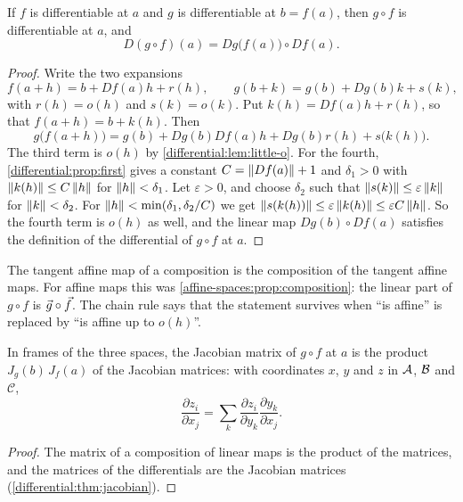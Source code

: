 \begin{notechapter}
\begin{theorem}\label{chain-rule-autodiff:thm:chain}
If $f$ is differentiable at $a$ and $g$ is differentiable at $b = f(a)$,
then $g\circ f$ is differentiable at $a$, and
\[
  D(g\circ f)(a) = Dg\bigl(f(a)\bigr)\circ Df(a) .
\]
\end{theorem}

\begin{proof}
Write the two expansions
\[
  f(a + h) = b + Df(a)h + r(h), \qquad
  g(b + k) = g(b) + Dg(b)k + s(k),
\]
with $r(h) = o(h)$ and $s(k) = o(k)$. Put $k(h) = Df(a)h + r(h)$, so that
$f(a + h) = b + k(h)$. Then
\[
  g\bigl(f(a + h)\bigr)
  = g(b) + Dg(b)Df(a)h + Dg(b)r(h) + s\bigl(k(h)\bigr) .
\]
The third term is $o(h)$ by \cref{differential:lem:little-o}. For the
fourth, \cref{differential:prop:first} gives a constant
$C = \left\|Df(a)\right\| + 1$ and $\delta_1 > 0$ with $\left\|k(h)\right\|\leq C\left\|h\right\|$
for $\left\|h\right\| < \delta_1$. Let $\varepsilon > 0$, and choose $\delta_2$
such that $\left\|s(k)\right\|\leq\varepsilon\left\|k\right\|$ for $\left\|k\right\| < \delta_2$.
For $\left\|h\right\| < \min(\delta_1, \delta_2/C)$ we get
$\left\|s(k(h))\right\|\leq\varepsilon\left\|k(h)\right\|\leq\varepsilon C\left\|h\right\|$. So
the fourth term is $o(h)$ as well, and the linear map $Dg(b)\circ Df(a)$
satisfies the definition of the differential of $g\circ f$ at $a$.
\end{proof}

\begin{keyidea}
The tangent affine map of a composition is the composition of the tangent
affine maps. For affine maps this was
\cref{affine-spaces:prop:composition}: the linear part of $g\circ f$ is
$\vec{g}\circ\vec{f}$. The chain rule says that the statement survives when
``is affine'' is replaced by ``is affine up to $o(h)$''.
\end{keyidea}

\begin{corollary}[In coordinates]\label{chain-rule-autodiff:cor:jacobian}
In frames of the three spaces, the Jacobian matrix of $g\circ f$ at $a$ is
the product $J_g(b)\,J_f(a)$ of the Jacobian matrices: with coordinates
$x$, $y$ and $z$ in $\mathcal{A}$, $\mathcal{B}$ and $\mathcal C$,
\[
  \frac{\partial z_i}{\partial x_j}
  = \sum_k\frac{\partial z_i}{\partial y_k}
    \frac{\partial y_k}{\partial x_j} .
\]
\end{corollary}

\begin{proof}
The matrix of a composition of linear maps is the product of the matrices,
and the matrices of the differentials are the Jacobian matrices
(\cref{differential:thm:jacobian}).
\end{proof}


\end{notechapter}
